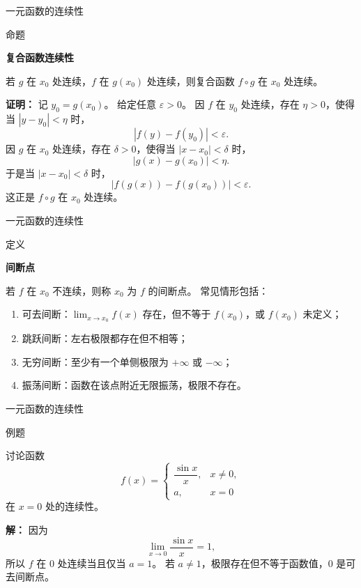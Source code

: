 \documentclass[aspectratio=169,10pt,fontset=fandol]{ctexbeamer}
\begin{document}
\begin{frame}[t,fragile]{一元函数的连续性}
\footnotesize
\begin{block}{命题}
{\footnotesize
\textbf{复合函数连续性}\par

若 $g$ 在 $x_0$ 处连续，$f$ 在 $g(x_0)$ 处连续，则复合函数 $f\circ g$ 在 $x_0$ 处连续。

}
\end{block}
\pause
{\footnotesize
\textbf{证明：}
记 $y_0=g(x_0)$。 给定任意 $\varepsilon>0$。 因 $f$ 在 $y_0$ 处连续，存在 $\eta>0$，使得当 $|y-y_0|<\eta$ 时，
\[
|f(y)-f(y_0)|<\varepsilon.
\]
因 $g$ 在 $x_0$ 处连续，存在 $\delta>0$，使得当 $|x-x_0|<\delta$ 时，
\[
|g(x)-g(x_0)|<\eta.
\]
于是当 $|x-x_0|<\delta$ 时，
\[
|f(g(x))-f(g(x_0))|<\varepsilon.
\]
这正是 $f\circ g$ 在 $x_0$ 处连续。

}
\end{frame}
\begin{frame}[t,fragile]{一元函数的连续性}
\footnotesize
\begin{block}{定义}
{\footnotesize
\textbf{间断点}\par

若 $f$ 在 $x_0$ 不连续，则称 $x_0$ 为 $f$ 的间断点。 常见情形包括：
\begin{enumerate}[(1)]
\item 可去间断：$\lim_{x\to x_0}f(x)$ 存在，但不等于 $f(x_0)$，或 $f(x_0)$ 未定义；
\item 跳跃间断：左右极限都存在但不相等；
\item 无穷间断：至少有一个单侧极限为 \(+\infty\) 或 \(-\infty\)；
\item 振荡间断：函数在该点附近无限振荡，极限不存在。
\end{enumerate}

}
\end{block}
\end{frame}
\begin{frame}[t,fragile]{一元函数的连续性}
\footnotesize
\begin{block}{例题}
{\footnotesize
讨论函数
\[
f(x)=
\begin{cases}
\dfrac{\sin x}{x},&x\neq0,\\
a,&x=0
\end{cases}
\]
在 $x=0$ 处的连续性。

}
\end{block}
\pause
{\footnotesize
\textbf{解：}
因为
\[
\lim_{x\to0}\frac{\sin x}{x}=1,
\]
所以 $f$ 在 $0$ 处连续当且仅当 $a=1$。 若 $a\neq1$，极限存在但不等于函数值，$0$ 是可去间断点。

}
\end{frame}
\end{document}
